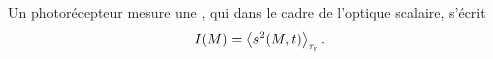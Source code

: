 \documentclass[12pt,fancy]{cours}
\begin{document}

\begin{definition}\label{def:}
Un photorécepteur mesure une , qui dans le cadre de l'optique scalaire, s'écrit $$I(M) =\left\langle {s^{2}(M,t)} \right\rangle_{\rm \tau_r}.$$
\end{definition}


\end{document}
